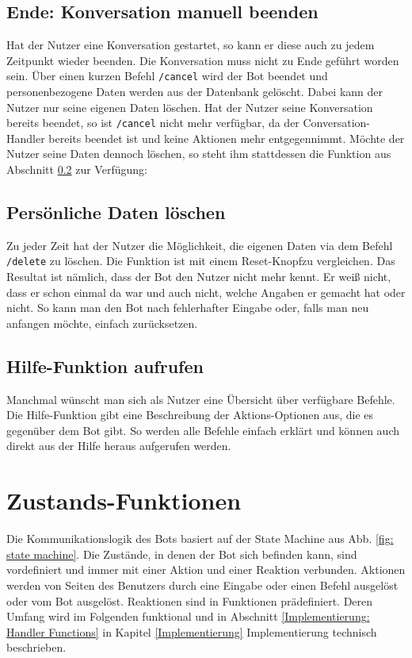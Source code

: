         \subsection{Ende: Konversation manuell beenden}
            Hat der Nutzer eine Konversation gestartet, so kann er diese auch zu jedem Zeitpunkt wieder beenden. Die Konversation muss nicht zu Ende geführt worden sein. Über einen kurzen Befehl \verb|/cancel| wird der Bot beendet und personenbezogene Daten werden aus der Datenbank gelöscht. Dabei kann der Nutzer nur seine eigenen Daten löschen. Hat der Nutzer seine Konversation bereits beendet, so ist \verb|/cancel| nicht mehr verfügbar, da der Conversation-Handler bereits beendet ist und keine Aktionen mehr entgegennimmt. Möchte der Nutzer seine Daten dennoch löschen, so steht ihm stattdessen die Funktion aus Abschnitt \ref*{Realisierung: delete} zur Verfügung: 
        
        \subsection{Persönliche Daten löschen} \label{Realisierung: delete}
            Zu jeder Zeit hat der Nutzer die Möglichkeit, die eigenen Daten via dem Befehl \verb|/delete| zu löschen. Die Funktion ist mit einem \glqq Reset-Knopf\grqq  zu vergleichen. Das Resultat ist nämlich, dass der Bot den Nutzer nicht mehr kennt. Er weiß nicht, dass er schon einmal da war und auch nicht, welche Angaben er gemacht hat oder nicht. So kann man den Bot nach fehlerhafter Eingabe oder, falls man neu anfangen möchte, einfach zurücksetzen.
        
        \subsection{Hilfe-Funktion aufrufen}
            Manchmal wünscht man sich als Nutzer eine Übersicht über verfügbare Befehle. Die Hilfe-Funktion gibt eine Beschreibung der Aktions-Optionen aus, die es gegenüber dem Bot gibt. So werden alle Befehle einfach erklärt und können auch direkt aus der Hilfe heraus aufgerufen werden.  



    \section{Zustands-Funktionen} \label{Realisierung: state functions}
        Die Kommunikationslogik des Bots basiert auf der State Machine aus Abb. \ref*{fig: state machine}. Die Zustände, in denen der Bot sich befinden kann, sind vordefiniert und immer mit einer Aktion und einer Reaktion verbunden. Aktionen werden von Seiten des Benutzers durch eine Eingabe oder einen Befehl ausgelöst oder vom Bot ausgelöst. Reaktionen sind in Funktionen prädefiniert. Deren Umfang wird im Folgenden funktional und in Abschnitt \ref*{Implementierung: Handler Functions} in Kapitel \ref{Implementierung} Implementierung technisch beschrieben.
            
